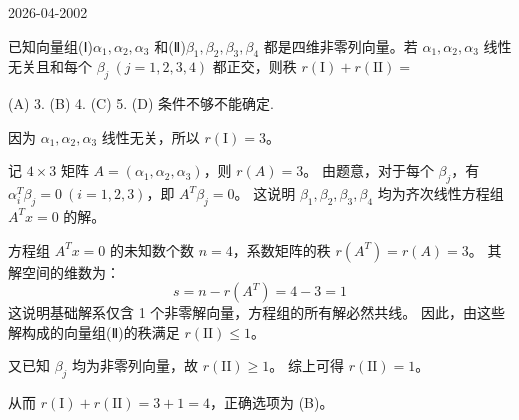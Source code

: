 \begin{mistake}{2026-04-20}{02}

\begin{problemcontent}
已知向量组(Ⅰ)\(\alpha_1, \alpha_2, \alpha_3\) 和(Ⅱ)\(\beta_1, \beta_2, \beta_3, \beta_4\) 都是四维非零列向量。若 \(\alpha_1, \alpha_2, \alpha_3\) 线性无关且和每个 \(\beta_j\ (j=1,2,3,4)\) 都正交，则秩 \(r(\mathrm{I}) + r(\mathrm{II}) =\)

(A) 3. \qquad (B) 4. \qquad (C) 5. \qquad (D) 条件不够不能确定.
\end{problemcontent}

\begin{solutioncontent}
因为 \(\alpha_1, \alpha_2, \alpha_3\) 线性无关，所以 \(r(\mathrm{I}) = 3\)。

记 \(4 \times 3\) 矩阵 \(A = (\alpha_1, \alpha_2, \alpha_3)\)，则 \(r(A)=3\)。
由题意，对于每个 \(\beta_j\)，有 \(\alpha_i^T \beta_j = 0\ (i=1,2,3)\)，即 \(A^T \beta_j = 0\)。
这说明 \(\beta_1, \beta_2, \beta_3, \beta_4\) 均为齐次线性方程组 \(A^T x = 0\) 的解。

方程组 \(A^T x = 0\) 的未知数个数 \(n=4\)，系数矩阵的秩 \(r(A^T) = r(A) = 3\)。
其解空间的维数为：
\[
 s = n - r(A^T) = 4 - 3 = 1
\]
这说明基础解系仅含 1 个非零解向量，方程组的所有解必然共线。
因此，由这些解构成的向量组(Ⅱ)的秩满足 \(r(\mathrm{II}) \le 1\)。

又已知 \(\beta_j\) 均为非零列向量，故 \(r(\mathrm{II}) \ge 1\)。
综上可得 \(r(\mathrm{II}) = 1\)。

从而 \(r(\mathrm{I}) + r(\mathrm{II}) = 3 + 1 = 4\)，正确选项为 (B)。
\end{solutioncontent}


\end{mistake}
